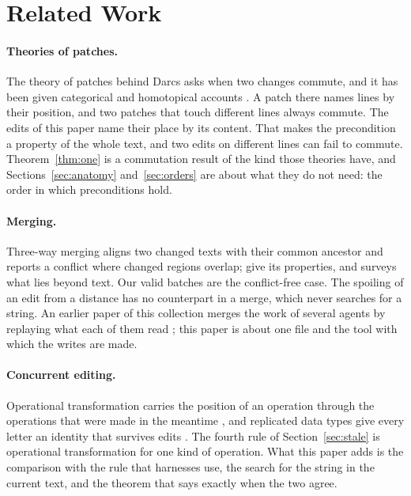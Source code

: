 \documentclass[acmsmall,nonacm,screen]{acmart}
\begin{document}
\section{Related Work}\label{sec:related}

\paragraph{Theories of patches.} The theory of patches behind Darcs asks when two changes
commute, and it has been given categorical and homotopical accounts
\citep{Mimram2013,Angiuli2014}. A patch there names lines by their position, and two patches
that touch different lines always commute. The edits of this paper name their place by its
content. That makes the precondition a property of the whole text, and two edits on
different lines can fail to commute. Theorem~\ref{thm:one} is a commutation result of the
kind those theories have, and Sections~\ref{sec:anatomy} and~\ref{sec:orders} are about what
they do not need: the order in which preconditions hold.

\paragraph{Merging.} Three-way merging aligns two changed texts with their common ancestor
and reports a conflict where changed regions overlap; \citet{Khanna2007} give its
properties, and \citet{Mens2002} surveys what lies beyond text. Our valid batches are the
conflict-free case. The spoiling of an edit from a distance has no counterpart in a merge,
which never searches for a string. An earlier paper of this collection merges the work of
several agents by replaying what each of them read \citep{tpp9}; this paper is about one
file and the tool with which the writes are made.

\paragraph{Concurrent editing.} Operational transformation carries the position of an
operation through the operations that were made in the meantime \citep{Ellis1989,Sun1998},
and replicated data types give every letter an identity that survives edits
\citep{Shapiro2011}. The fourth rule of Section~\ref{sec:stale} is operational transformation
for one kind of operation. What this paper adds is the comparison with the rule that
harnesses use, the search for the string in the current text, and the theorem that says
exactly when the two agree.
\end{document}
